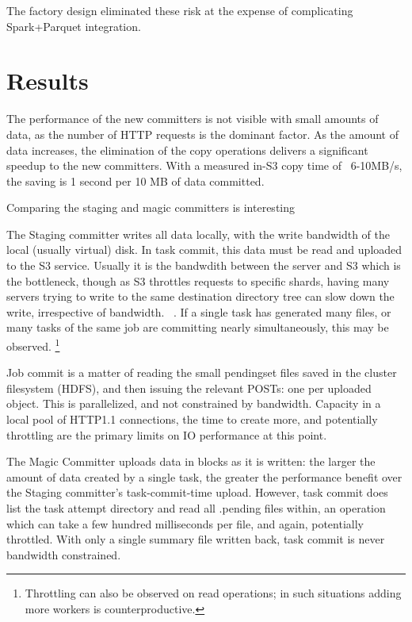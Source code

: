 \documentclass[9pt,technote]{IEEEtran}
\begin{document}
The factory design eliminated these risk at the expense of complicating
Spark+Parquet integration.

\section{Results}
\label{sec:results}


The performance of the new committers is not visible with small amounts
of data, as the number of HTTP requests is the dominant factor.
As the amount of data increases, the elimination of the copy operations
delivers a significant speedup to the new committers.
With a measured in-S3 copy time of ~6-10MB/s, the saving is 1 second per 10 MB
of data committed.

Comparing the staging and magic committers is interesting

The Staging committer writes all data locally, with the write bandwidth
of the local (usually virtual) disk.
In task commit, this data must be read and uploaded to the S3 service.
Usually it is the bandwdith between the server and S3 which is the bottleneck,
though as S3 throttles requests to specific shards, having many servers trying
to write to the same destination directory tree can slow down the write, irrespective
of bandwidth.
\ \cite{cite}.
If a single task has generated many files, or many tasks of the same job are
committing nearly simultaneously, this may be observed.
\footnote{Throttling can also be observed on read operations;
in such situations adding more workers is counterproductive.}

Job commit is a matter of reading the small pendingset files saved in the
cluster filesystem (HDFS), and then issuing the relevant POSTs: one per uploaded
object.
This is parallelized, and not constrained by bandwidth.
Capacity in a local pool of HTTP1.1 connections, the time to create more,
and potentially throttling are the primary limits on IO performance at this point.

The Magic Committer uploads data in blocks as it is written: the larger
the amount of data created by a single task, the greater the performance
benefit over the Staging committer's task-commit-time upload.
However, task commit does list the task attempt directory and read all .pending
files within, an operation which can take a few hundred milliseconds per file,
and again, potentially throttled.
With only a single summary file written back, task commit is never
bandwidth constrained.
\end{document}
